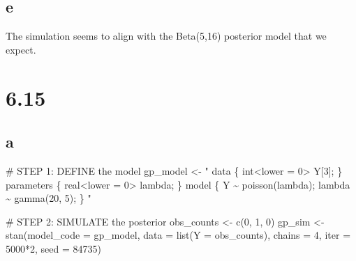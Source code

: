 \documentclass[
  letterpaper,
  DIV=11,
  numbers=noendperiod]{scrartcl}
\newenvironment{Shaded}{\begin{snugshade}}{\end{snugshade}}
\newcommand{\AttributeTok}[1]{\textcolor[rgb]{0.40,0.45,0.13}{#1}}
\newcommand{\CommentTok}[1]{\textcolor[rgb]{0.37,0.37,0.37}{#1}}
\newcommand{\DecValTok}[1]{\textcolor[rgb]{0.68,0.00,0.00}{#1}}
\newcommand{\FunctionTok}[1]{\textcolor[rgb]{0.28,0.35,0.67}{#1}}
\newcommand{\NormalTok}[1]{\textcolor[rgb]{0.00,0.23,0.31}{#1}}
\newcommand{\OtherTok}[1]{\textcolor[rgb]{0.00,0.23,0.31}{#1}}
\newcommand{\SpecialCharTok}[1]{\textcolor[rgb]{0.37,0.37,0.37}{#1}}
\newcommand{\StringTok}[1]{\textcolor[rgb]{0.13,0.47,0.30}{#1}}
\begin{document}
\hypertarget{e-2}{%
\subsection{e}\label{e-2}}

The simulation seems to align with the Beta(5,16) posterior model that
we expect.

\hypertarget{section-7}{%
\section{6.15}\label{section-7}}

\hypertarget{a-7}{%
\subsection{a}\label{a-7}}

\begin{Shaded}
\begin{Highlighting}[]
\CommentTok{\# STEP 1: DEFINE the model}
\NormalTok{gp\_model }\OtherTok{\textless{}{-}} \StringTok{"}
\StringTok{  data \{}
\StringTok{    int\textless{}lower = 0\textgreater{} Y[3];}
\StringTok{  \}}
\StringTok{  parameters \{}
\StringTok{    real\textless{}lower = 0\textgreater{} lambda;}
\StringTok{  \}}
\StringTok{  model \{}
\StringTok{    Y \textasciitilde{} poisson(lambda);}
\StringTok{    lambda \textasciitilde{} gamma(20, 5);}
\StringTok{  \}}
\StringTok{"}

\CommentTok{\# STEP 2: SIMULATE the posterior}
\NormalTok{obs\_counts }\OtherTok{\textless{}{-}} \FunctionTok{c}\NormalTok{(}\DecValTok{0}\NormalTok{, }\DecValTok{1}\NormalTok{, }\DecValTok{0}\NormalTok{)}
\NormalTok{gp\_sim }\OtherTok{\textless{}{-}} \FunctionTok{stan}\NormalTok{(}\AttributeTok{model\_code =}\NormalTok{ gp\_model, }
               \AttributeTok{data =} \FunctionTok{list}\NormalTok{(}\AttributeTok{Y =}\NormalTok{ obs\_counts), }
               \AttributeTok{chains =} \DecValTok{4}\NormalTok{, }\AttributeTok{iter =} \DecValTok{5000}\SpecialCharTok{*}\DecValTok{2}\NormalTok{, }\AttributeTok{seed =} \DecValTok{84735}\NormalTok{)}
\end{Highlighting}
\end{Shaded}
\end{document}
